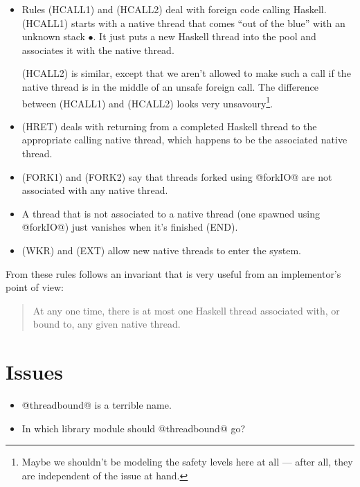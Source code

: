 \documentclass{article}
\begin{document}
\begin{itemize}
\item Rules (HCALL1) and (HCALL2) deal with foreign code calling Haskell.
(HCALL1) starts with a native thread that comes ``out of the blue'' with an
unknown stack $\bullet$. It just puts a new Haskell thread into the pool and
associates it with the native thread.

(HCALL2) is similar, except that we aren't allowed to make such a call if
the native thread is in the middle of an unsafe foreign call.  The difference
between (HCALL1) and (HCALL2) looks very unsavoury\footnote{Maybe we shouldn't
be modeling the safety levels here at all --- after all, they are independent
of the issue at hand.}.

\item (HRET) deals with returning from a completed Haskell thread to the
appropriate calling native thread, which happens to be the associated native
thread.

\item (FORK1) and (FORK2) say that threads forked using @forkIO@ are not
associated with any native thread.

\item A thread that is not associated to a native thread (one spawned using
@forkIO@) just vanishes when it's finished (END).

\item (WKR) and (EXT) allow new native threads to enter the system.

\end{itemize}

From these rules follows an invariant that is very useful from an implementor's
point of view:

\begin{quote}
  At any one time, there is at most one Haskell thread
  associated with, or bound to, any given native thread.
\end{quote}

\section{Issues}

\begin{itemize}
\item @threadbound@ is a terrible name.
\item In which library module should @threadbound@ go?
\end{itemize}
\end{document}
